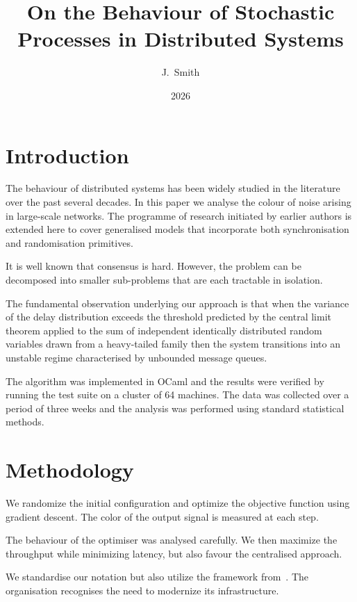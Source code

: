 \documentclass{article}
\title{On the Behaviour of Stochastic Processes in Distributed Systems}
\author{J.~Smith}
\date{2026}
\begin{document}
\maketitle

\section{Introduction}

The behaviour of distributed systems has been widely studied in the literature over
the past several decades.  In this paper we analyse the colour of noise arising in
large-scale networks.  The programme of research initiated by earlier authors is
extended here to cover generalised models that incorporate both synchronisation
and randomisation primitives.

It is well known that consensus is hard.  However,  the problem can be decomposed
into smaller sub-problems that are each tractable in isolation.

The fundamental observation underlying our approach is that when the variance of the
delay distribution exceeds the threshold predicted by the central limit theorem applied
to the sum of independent identically distributed random variables drawn from a
heavy-tailed family then the system transitions into an unstable regime characterised
by unbounded message queues.

The algorithm was implemented in OCaml and the results were verified by running
the test suite on a cluster of 64 machines.  The data was collected over a period
of three weeks and the analysis was performed using standard statistical methods.

\section{Methodology}

We randomize the initial configuration and optimize the objective function using
gradient descent.  The color of the output signal is measured at each step.

The behaviour of the optimiser was analysed carefully.  We then maximize the
throughput while minimizing latency, but also favour the centralised approach.

We standardise our notation but also utilize the framework from~\cite{jones2024}.
The organisation recognises the need to modernize its infrastructure.
\end{document}
